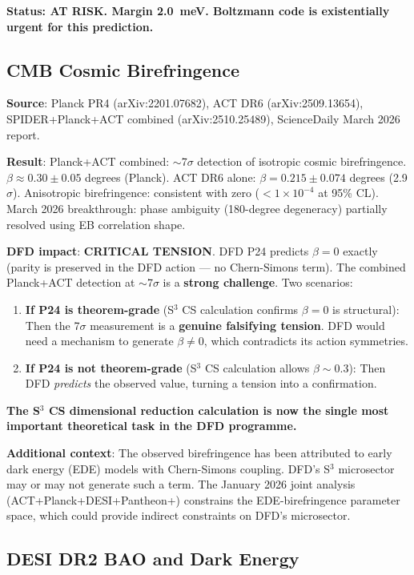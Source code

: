 \documentclass[11pt]{article}
\begin{document}
\textbf{Status: AT RISK. Margin 2.0~meV. Boltzmann code is existentially urgent for this prediction.}

\subsection{CMB Cosmic Birefringence}

\textbf{Source}: Planck PR4 (arXiv:2201.07682), ACT DR6 (arXiv:2509.13654), SPIDER+Planck+ACT combined (arXiv:2510.25489), ScienceDaily March 2026 report.

\textbf{Result}: Planck+ACT combined: $\sim$7$\sigma$ detection of isotropic cosmic birefringence. $\beta \approx 0.30 \pm 0.05$ degrees (Planck). ACT DR6 alone: $\beta = 0.215 \pm 0.074$ degrees (2.9$\sigma$). Anisotropic birefringence: consistent with zero ($< 1 \times 10^{-4}$ at 95\% CL). March 2026 breakthrough: phase ambiguity (180-degree degeneracy) partially resolved using EB correlation shape.

\textbf{DFD impact}: \textbf{CRITICAL TENSION}. DFD P24 predicts $\beta = 0$ exactly (parity is preserved in the DFD action --- no Chern-Simons term). The combined Planck+ACT detection at $\sim$7$\sigma$ is a \textbf{strong challenge}. Two scenarios:

\begin{enumerate}
\item \textbf{If P24 is theorem-grade} (S$^3$ CS calculation confirms $\beta = 0$ is structural): Then the 7$\sigma$ measurement is a \textbf{genuine falsifying tension}. DFD would need a mechanism to generate $\beta \neq 0$, which contradicts its action symmetries.
\item \textbf{If P24 is not theorem-grade} (S$^3$ CS calculation allows $\beta \sim 0.3$): Then DFD \emph{predicts} the observed value, turning a tension into a confirmation.
\end{enumerate}

\textbf{The S$^3$ CS dimensional reduction calculation is now the single most important theoretical task in the DFD programme.}

\textbf{Additional context}: The observed birefringence has been attributed to early dark energy (EDE) models with Chern-Simons coupling. DFD's S$^3$ microsector may or may not generate such a term. The January 2026 joint analysis (ACT+Planck+DESI+Pantheon+) constrains the EDE-birefringence parameter space, which could provide indirect constraints on DFD's microsector.

\subsection{DESI DR2 BAO and Dark Energy}
\end{document}
